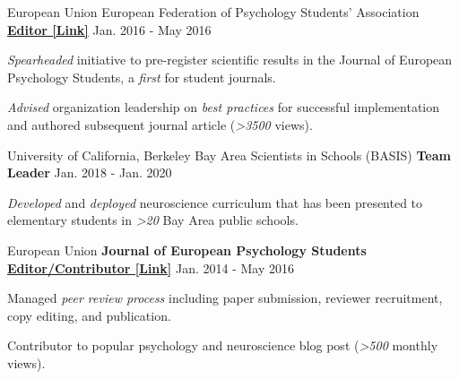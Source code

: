 \begin{cventries}
  \cventry
    {European Union}
    {European Federation of Psychology Students' Association} %
    {\href{https://jeps.efpsa.org/articles/10.5334/jeps.401/}{\textbf{Editor [Link]}}} %
    {Jan. 2016 - May 2016} %
    {
      \begin{cvitems} %
        \item {\textit{Spearheaded} initiative to pre-register scientific results in the Journal of European Psychology Students, a \textit{first} for student journals.}
        \item {\textit{Advised} organization leadership on \textit{best practices} for successful implementation and authored subsequent journal article (\textit{>3500} views).}
      \end{cvitems}
    }


  \cventry
  	{University of California, Berkeley} %
  	{Bay Area Scientists in Schools (BASIS)}
    {\textbf{Team Leader}} %
    {Jan. 2018 - Jan. 2020} %
    {
      \begin{cvitems} %
        \item {\textit{Developed} and \textit{deployed} neuroscience curriculum that has been presented to elementary students in \textit{>20} Bay Area public schools.}
      \end{cvitems}
    }

\begin{cventries}

  \cventry
    {European Union}
    {\textbf{Journal of European Psychology Students}} %
    {\href{https://blog.efpsa.org/2015/09/22/editors-pick-our-favourite-psychology-and-neuroscience-podcasts}{\textbf{Editor/Contributor [Link]}}} %
    {Jan. 2014 - May 2016} %
    {
      \begin{cvitems} %
      	\item {Managed \textit{peer review process} including paper submission, reviewer recruitment, copy editing, and publication.}
        \item {Contributor to popular psychology and neuroscience blog post (\textit{>500} monthly views).}
      \end{cvitems}
    }
    

\end{cventries}
\end{cventries}
